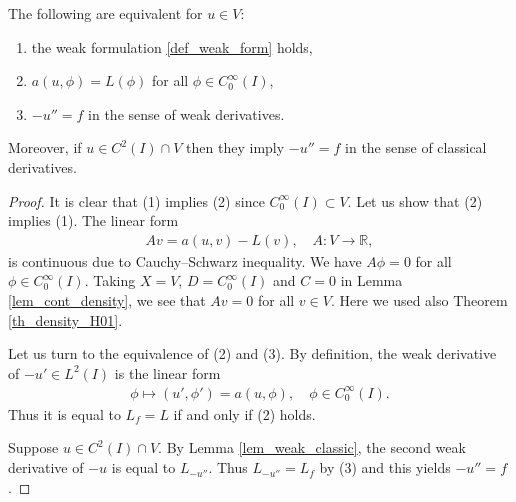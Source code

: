 \documentclass[12pt,oneside,final]{amsart}
\def\R{\mathbb R}
\begin{document}
\begin{lemma}\label{lem_formulations}
The following are equivalent for $u \in V$:
\begin{enumerate}
\item the weak formulation \eqref{def_weak_form} holds,
\item $a(u, \phi) = L(\phi)$ for all $\phi \in C_0^\infty(I)$,
\item $-u'' = f$ in the sense of weak derivatives.
\end{enumerate}
Moreover, if $u \in C^2(I) \cap V$ then they imply $-u'' = f$ in the sense of classical derivatives. 
\end{lemma}
\begin{proof}
It is clear that (1) implies (2) since $C_0^\infty(I) \subset V$.
Let us show that (2) implies (1).
The linear form 
    \begin{align*}
Av = a(u,v) - L(v), \quad A : V \to \R,
    \end{align*}
is continuous due to Cauchy--Schwarz inequality.
We have $A\phi = 0$ for all $\phi \in C_0^\infty(I)$.
Taking $X = V$, $D = C_0^\infty(I)$ and $C = 0$ in Lemma \ref{lem_cont_density}, we see that $Av = 0$ for all $v \in V$.
Here we used also Theorem \ref{th_density_H01}.

Let us turn to the equivalence of (2) and (3).
By definition, the weak derivative of $-u' \in L^2(I)$ is the linear form 
    \begin{align*}
\phi \mapsto (u', \phi') = a(u, \phi), \quad \phi \in C_0^\infty(I).
    \end{align*} 
Thus it is equal to $L_f = L$ if and only if (2) holds.

Suppose $u \in C^2(I) \cap V$.
By Lemma \ref{lem_weak_classic}, the second weak derivative of $-u$ is equal to $L_{-u''}$.
Thus $L_{-u''} = L_f$ by (3)
and this yields $-u'' = f$.
\end{proof}
\end{document}
